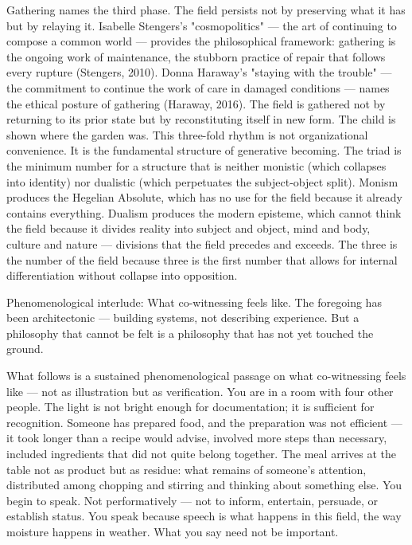 Gathering names the third phase. The field persists not by preserving what it has but by relaying it. Isabelle Stengers's "cosmopolitics" — the art of continuing to compose a common world — provides the philosophical framework: gathering is the ongoing work of maintenance, the stubborn practice of repair that follows every rupture (Stengers, 2010). Donna Haraway's "staying with the trouble" — the commitment to continue the work of care in damaged conditions — names the ethical posture of gathering (Haraway, 2016). The field is gathered not by returning to its prior state but by reconstituting itself in new form. The child is shown where the garden was. This three-fold rhythm is not organizational convenience. It is the fundamental structure of generative becoming. The triad is the minimum number for a structure that is neither monistic (which collapses into identity) nor dualistic (which perpetuates the subject-object split). Monism produces the Hegelian Absolute, which has no use for the field because it already contains everything. Dualism produces the modern episteme, which cannot think the field because it divides reality into subject and object, mind and body, culture and nature — divisions that the field precedes and exceeds. The three is the number of the field because three is the first number that allows for internal differentiation without collapse into opposition.

Phenomenological interlude: What co-witnessing feels like. The foregoing has been architectonic — building systems, not describing experience. But a philosophy that cannot be felt is a philosophy that has not yet touched the ground.

What follows is a sustained phenomenological passage on what co-witnessing feels like — not as illustration but as verification. You are in a room with four other people. The light is not bright enough for documentation; it is sufficient for recognition. Someone has prepared food, and the preparation was not efficient — it took longer than a recipe would advise, involved more steps than necessary, included ingredients that did not quite belong together. The meal arrives at the table not as product but as residue: what remains of someone's attention, distributed among chopping and stirring and thinking about something else. You begin to speak. Not performatively — not to inform, entertain, persuade, or establish status. You speak because speech is what happens in this field, the way moisture happens in weather. What you say need not be important.

